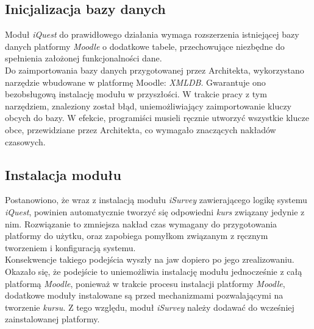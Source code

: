 \subsection{Inicjalizacja bazy danych}
\label{Chapter623}

Moduł \textit{iQuest} do prawidłowego działania wymaga rozszerzenia istniejącej bazy danych platformy \textit{Moodle} o dodatkowe tabele, przechowujące niezbędne do spełnienia założonej funkcjonalności dane. \\

Do zaimportowania bazy danych przygotowanej przez Architekta, wykorzystano narzędzie wbudowane w platformę Moodle: \textit{XMLDB}. Gwarantuje ono bezobsługową instalację modułu w przyszłości. W trakcie pracy z tym narzędziem, znaleziony został błąd, uniemożliwiający zaimportowanie kluczy obcych do bazy. W efekcie, programiści musieli ręcznie utworzyć wszystkie klucze obce, przewidziane przez Architekta, co wymagało znaczących nakładów czasowych.

\subsection{Instalacja modułu}
\label{Chapter624}
Postanowiono, że wraz z instalacją modułu \textit{iSurvey} zawierającego logikę systemu \textit{iQuest}, powinien automatycznie tworzyć się odpowiedni \textit{kurs} związany jedynie z nim. Rozwiązanie to zmniejsza nakład czas wymagany do przygotowania platformy do użytku, oraz zapobiega pomyłkom związanym z ręcznym tworzeniem i konfiguracją systemu. \\

Konsekwencje takiego podejścia wyszły na jaw dopiero po jego zrealizowaniu. Okazało się, że podejście to uniemożliwia instalację modułu jednocześnie z całą platformą \textit{Moodle}, ponieważ w trakcie procesu instalacji platformy \textit{Moodle}, dodatkowe moduły instalowane są przed mechanizmami pozwalającymi na tworzenie \textit{kursu}. Z tego względu, moduł \textit{iSurvey} należy dodawać do wcześniej zainstalowanej platformy.